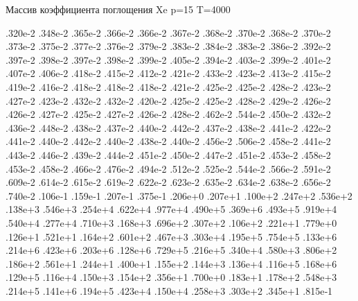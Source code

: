 \noindent Массив коэффициента поглощения Xe p=15 T=4000

\noindent .320e‑2 .348e‑2 .365e‑2 .366e‑2 .366e‑2 .367e‑2 .368e‑2 .370e‑2 .368e‑2 .370e‑2 .373e‑2 .375e‑2 .377e‑2 .376e‑2 .379e‑2 .383e‑2 .384e‑2 .383e‑2 .386e‑2 .392e‑2 .397e‑2 .398e‑2 .397e‑2 .398e‑2 .399e‑2 .405e‑2 .394e‑2 .403e‑2 .399e‑2 .401e‑2 .407e‑2 .406e‑2 .418e‑2 .415e‑2 .412e‑2 .421e‑2 .433e‑2 .423e‑2 .413e‑2 .415e‑2 .419e‑2 .416e‑2 .418e‑2 .418e‑2 .418e‑2 .421e‑2 .425e‑2 .425e‑2 .428e‑2 .423e‑2 .427e‑2 .423e‑2 .432e‑2 .432e‑2 .420e‑2 .425e‑2 .425e‑2 .428e‑2 .429e‑2 .426e‑2 .426e‑2 .427e‑2 .425e‑2 .427e‑2 .426e‑2 .428e‑2 .462e‑2 .544e‑2 .450e‑2 .432e‑2 .436e‑2 .448e‑2 .438e‑2 .437e‑2 .440e‑2 .442e‑2 .437e‑2 .438e‑2 .441e‑2 .422e‑2 .441e‑2 .440e‑2 .442e‑2 .440e‑2 .438e‑2 .440e‑2 .456e‑2 .506e‑2 .458e‑2 .441e‑2 .443e‑2 .446e‑2 .439e‑2 .444e‑2 .451e‑2 .450e‑2 .447e‑2 .451e‑2 .453e‑2 .458e‑2 .453e‑2 .458e‑2 .466e‑2 .476e‑2 .494e‑2 .512e‑2 .525e‑2 .544e‑2 .566e‑2 .591e‑2 .609e‑2 .614e‑2 .615e‑2 .619e‑2 .622e‑2 .623e‑2 .635e‑2 .634e‑2 .638e‑2 .656e‑2 .740e‑2 .106e‑1 .159e‑1 .207e‑1 .375e‑1 .206e+0 .207e+1 .100e+2 .247e+2 .536e+2 .138e+3 .546e+3 .254e+4 .622e+4 .977e+4 .490e+5 .369e+6 .493e+5 .919e+4 .540e+4 .277e+4 .710e+3 .168e+3 .696e+2 .307e+2 .106e+2 .221e+1 .779e+0 .126e+1 .521e+1 .164e+2 .601e+2 .467e+3 .303e+4 .195e+5 .754e+5 .133e+6 .214e+6 .423e+6 .203e+6 .128e+6 .729e+5 .216e+5 .340e+4 .580e+3 .806e+2 .186e+2 .561e+1 .244e+1 .400e+1 .155e+2 .144e+3 .136e+4 .116e+5 .168e+6 .129e+5 .116e+4 .150e+3 .154e+2 .356e+1 .700e+0 .183e+1 .178e+2 .548e+3 .214e+5 .141e+6 .194e+5 .423e+4 .150e+4 .258e+3 .303e+2 .345e+1 .815e‑1
